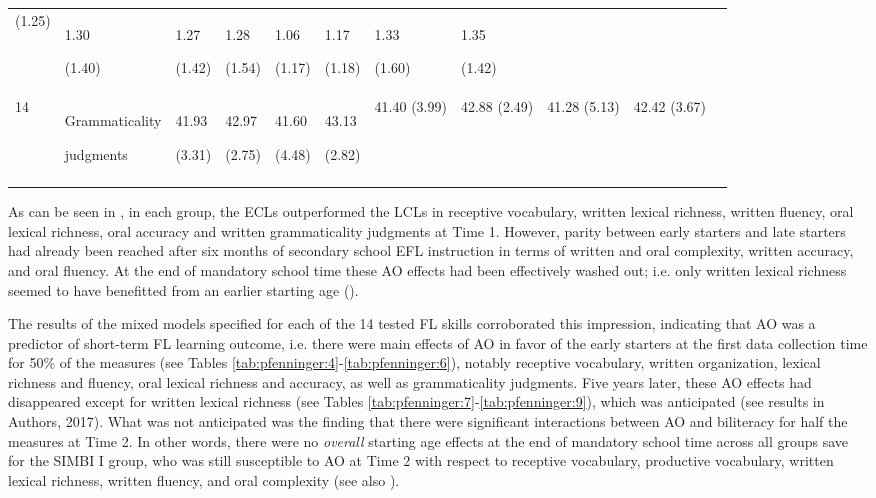 \documentclass[output=paper,modfonts,nonflat,newtxmath]{langsci/langscibook}
\begin{document}
\begin{table}
{\begin{tabularx}{\textwidth}{l p{4cm} YYYYYYYYY}
 (1.25) & { 1.30}

 (1.40) & { 1.27}

 (1.42) & { 1.28}

 (1.54) & { 1.06}

 (1.17) & { 1.17}

 (1.18) & { 1.33}

 (1.60) & { 1.35}

 (1.42)\\
 14 & Grammaticality

judgments & { 41.93}

 (3.31) & { 42.97}

 (2.75) & { 41.60}

 (4.48) & { 43.13}

 (2.82) & { 41.40} (3.99) & { 42.88} (2.49) & { 41.28} (5.13) & { 42.42} (3.67)\\
\lspbottomrule
\end{tabularx}
}

\end{table}

As can be seen in , in each group, the ECLs outperformed the LCLs in receptive vocabulary, written lexical richness, written fluency, oral lexical richness, oral accuracy and written grammaticality judgments at Time 1. However, parity between early starters and late starters had already been reached after six months of secondary school EFL instruction in terms of written and oral complexity, written accuracy, and oral fluency. At the end of mandatory school time these AO effects had been effectively washed out; i.e. only written lexical richness seemed to have benefitted from an earlier starting age ().

The results of the mixed models specified for each of the 14 tested FL skills corroborated this impression, indicating that AO was a predictor of short-term FL learning outcome, i.e. there were main effects of AO in favor of the early starters at the first data collection time for 50\% of the measures (see Tables \ref{tab:pfenninger:4}-\ref{tab:pfenninger:6}), notably receptive vocabulary, written organization, lexical richness and fluency, oral lexical richness and accuracy, as well as grammaticality judgments. Five years later, these AO effects had disappeared except for written lexical richness (see Tables \ref{tab:pfenninger:7}-\ref{tab:pfenninger:9}), which was anticipated (see results in Authors, 2017). What was not anticipated was the finding that there were significant interactions between AO and biliteracy for half the measures at Time 2. In other words, there were no \textit{overall} starting age effects at the end of mandatory school time across all groups save for the SIMBI I group, who was still susceptible to AO at Time 2 with respect to receptive vocabulary, productive vocabulary, written lexical richness, written fluency, and oral complexity (see also \citealt{PfenningerSingleton2019}).
\end{document}
